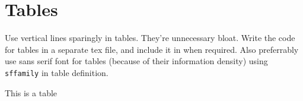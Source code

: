 \clearpage

\section{Tables}

Use vertical lines sparingly in tables. They're unnecessary bloat. Write the code for tables in a separate tex file, and include it in when required. Also preferrably use sans serif font for tables (because of their information density) using \texttt{\\sffamily} in table definition.

\begin{table}[!ht]
\small
\centering
\sffamily

\caption{This is a table}
\label{tab:table}
\vspace{-5mm}
\end{table}

